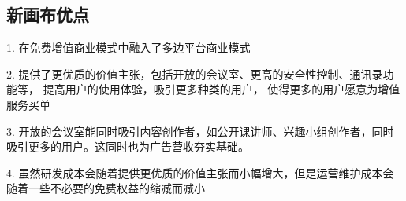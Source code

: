\documentclass[a4paper,12pt]{article}
\begin{document}
    \subsection{新画布优点}


    1.
    在免费增值商业模式中融入了多边平台商业模式


    2.
    提供了更优质的价值主张，包括开放的会议室、更高的安全性控制、通讯录功能等， 提高用户的使用体验，吸引更多种类的用户，
    使得更多的用户愿意为增值服务买单


    3.
    开放的会议室能同时吸引内容创作者，如公开课讲师、兴趣小组创作者，同时吸引更多的用户。这同时也为广告营收夯实基础。


    4.
    虽然研发成本会随着提供更优质的价值主张而小幅增大，但是运营维护成本会随着一些不必要的免费权益的缩减而减小



    
\end{document}
